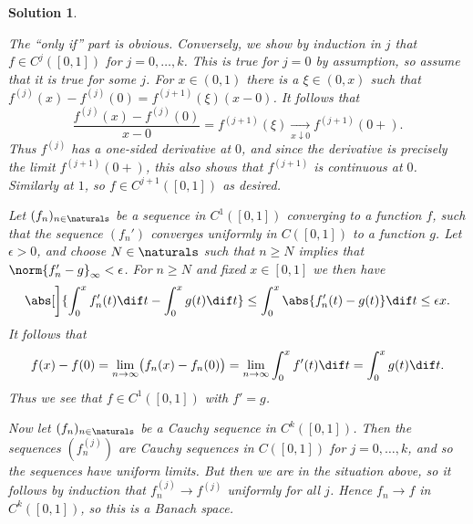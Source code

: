 \documentclass[article, a4paper, 11pt, oneside]{memoir}
\numberwithin{equation}{chapter}
\theoremstyle{nonumberplain}
\newtheorem{solution}{Solution}
\begin{document}
\begin{solution}
\begin{solutionsec}
	\item The \enquote{only if} part is obvious. Conversely, we show by induction in $j$ that $f \in C^j([0,1])$ for $j = 0, \ldots, k$. This is true for $j = 0$ by assumption, so assume that it is true for some $j$. For $x \in (0,1)$ there is a $\xi \in (0,x)$ such that $f^{(j)}(x) - f^{(j)}(0) = f^{(j+1)}(\xi)(x-0)$. It follows that
	\begin{equation*}
		\frac{ f^{(j)}(x) - f^{(j)}(0) }{x-0}
			= f^{(j+1)}(\xi)
			\xrightarrow[x \downarrow 0]{} f^{(j+1)}(0+).
	\end{equation*}
	Thus $f^{(j)}$ has a one-sided derivative at $0$, and since the derivative is precisely the limit $f^{(j+1)}(0+)$, this also shows that $f^{(j+1)}$ is continuous at $0$. Similarly at $1$, so $f \in C^{j+1}([0,1])$ as desired.

	\item Let $(f_n)_{n\in\naturals}$ be a sequence in $C^1([0,1])$ converging to a function $f$, such that the sequence $(f_n')$ converges uniformly in $C([0,1])$ to a function $g$. Let $\epsilon > 0$, and choose $N \in \naturals$ such that $n \geq N$ implies that $\norm{f_n' - g}_\infty < \epsilon$. For $n \geq N$ and fixed $x \in [0,1]$ we then have
	\begin{equation*}
		\abs[\bigg]{ \int_0^x f_n'(t) \dif t - \int_0^x g(t) \dif t }
			\leq \int_0^x \abs{f_n'(t) - g(t)} \dif t
			\leq \epsilon x.
	\end{equation*}
	It follows that
	\begin{equation*}
		f(x) - f(0)
			= \lim_{n\to\infty} \bigl( f_n(x) - f_n(0) \bigr)
			= \lim_{n\to\infty} \int_0^x f'(t) \dif t
			= \int_0^x g(t) \dif t.
	\end{equation*}
	Thus we see that $f \in C^1([0,1])$ with $f' = g$.

	Now let $(f_n)_{n\in\naturals}$ be a Cauchy sequence in $C^k([0,1])$. Then the sequences $(f_n^{(j)})$ are Cauchy sequences in $C([0,1])$ for $j = 0, \ldots, k$, and so the sequences have uniform limits. But then we are in the situation above, so it follows by induction that $f_n^{(j)} \to f^{(j)}$ uniformly for all $j$. Hence $f_n \to f$ in $C^k([0,1])$, so this is a Banach space.
\end{solutionsec}
\end{solution}
\end{document}
